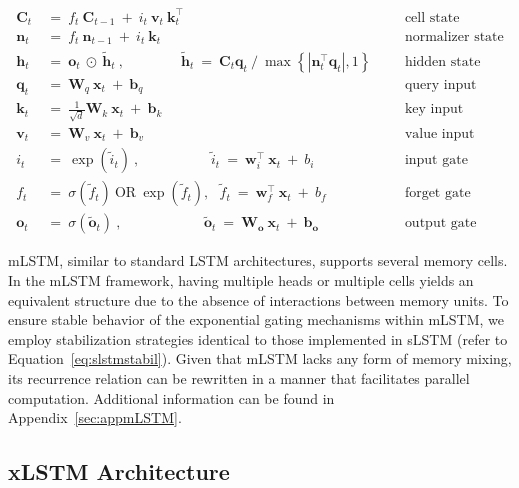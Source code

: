 \begin{align}
\label{eq:mlstm_recurrent_begin}
\mathbf{C}_t \ &= \  f_t \ \mathbf{C}_{t-1} \ + \ 
  i_t \ \mathbf{v}_t \ \mathbf{k}_t^\top & &  &\text{cell state} \\
\mathbf{n}_t \ &= \  f_t \ \mathbf{n}_{t-1} \ + \ 
  i_t \ \mathbf{k}_t & &  &\text{normalizer state} \\
\mathbf{h}_t  \ &= \ \mathbf{o}_t \ \odot \ \tilde{\mathbf{h}}_t
\ , \qquad \qquad 
\tilde{\mathbf{h}}_t \ = \   \mathbf{C}_t \mathbf{q}_t \ / \ 
  \max \left\{ |\mathbf{n}_t^\top \mathbf{q}_t|, 1 \right\} 
   &&&\text{hidden state} \\
\mathbf{q}_t \ &= \ \mathbf{W}_q \ \mathbf{x}_t \ + \ \mathbf{b}_q  & &  &\text{query input} \\
\mathbf{k}_t \ &= \ \frac{1}{\sqrt{d}} \mathbf{W}_k \ \mathbf{x}_t \ + \ \mathbf{b}_k  & &  &\text{key input} \\
\mathbf{v}_t \ &= \ \mathbf{W}_v \ \mathbf{x}_t \ + \ \mathbf{b}_v  & &  &\text{value input} \\
i_t \ &= \ \!\exp \!  \! \left( \tilde{i}_t  \right) \ , 
 \qquad \qquad \ \ \ \ \,
  \tilde{i}_t \ = \ \mathbf{w}^\top_{i} \ \mathbf{x}_t \ + \  b_{i} \ \ \ 
  &&&\text{input gate} \\
f_t \ &= \ \sigma \!  \left(  \tilde{f}_t \right) \ \text{OR} \ \!\exp \!  \! \left(  \tilde{f}_t \right) , \ \ \: \!
\tilde{f}_t \ = \ \mathbf{w}^\top_{f} \ \mathbf{x}_t  \ + \
  b_{f}
  &&& \text{forget gate} \\
\label{eq:mlstm_recurrent_end}
\mathbf{o}_t \ &= \ \sigma \left( \tilde{\mathbf{o}}_t \right) \ , \qquad \qquad \quad \ \ \ \,
  \tilde{\mathbf{o}}_t  \ = \ \mathbf{W}_{\mathbf{o}} \ \mathbf{x}_t \ + \
  \mathbf{b}_{\mathbf{o}}
  &&&\text{output gate} 
\end{align}

mLSTM, similar to standard LSTM architectures, supports several memory cells. In the mLSTM framework, having multiple heads or multiple cells yields an equivalent structure due to the absence of interactions between memory units. To ensure stable behavior of the exponential gating mechanisms within mLSTM, we employ stabilization strategies identical to those implemented in sLSTM (refer to Equation~\ref{eq:slstmstabil}). 
Given that mLSTM lacks any form of memory mixing, its recurrence relation can be rewritten in a manner that facilitates parallel computation. Additional information can be found in Appendix~\ref{sec:appmLSTM}.

\subsection{xLSTM Architecture}
\label{sec:xLSTMarch}

